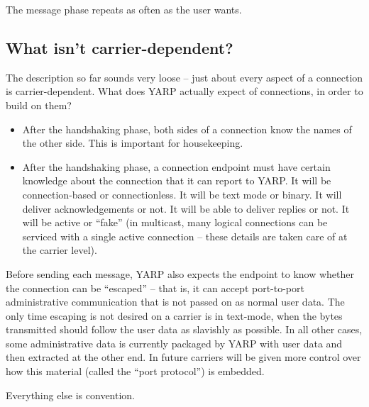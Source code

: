 The message phase repeats as often as the user wants.


\subsection{What isn't carrier-dependent?}

The description so far sounds very loose -- just about every aspect
of a connection is carrier-dependent.  What does YARP actually
expect of connections, in order to build on them?

\begin{itemize}

\item After the handshaking phase, both sides of a connection know the
names of the other side.  This is important for housekeeping.

\item After the handshaking phase, a connection endpoint must have
certain knowledge about the connection that it can report to YARP.  It
will be connection-based or connectionless.  It will be text mode or
binary.  It will deliver acknowledgements or not.  It will be able to
deliver replies or not.  It will be active or ``fake'' (in multicast,
many logical connections can be serviced with a single active
connection -- these details are taken care of at the carrier level).

\end{itemize}

Before sending each message, YARP also expects the endpoint to know
whether the connection can be ``escaped'' -- that is, it can accept
port-to-port administrative communication that is not passed on as
normal user data.  The only time escaping is not desired on a carrier
is in text-mode, when the bytes transmitted should follow the user
data as slavishly as possible.  In all other cases, some
administrative data is currently packaged by YARP with user data and
then extracted at the other end.  In future carriers will be given
more control over how this material (called the ``port protocol'') is
embedded.

Everything else is convention.

